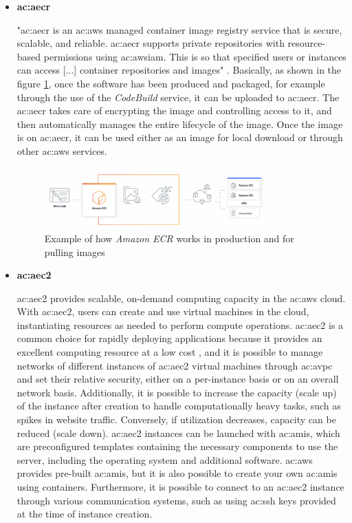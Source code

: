 \begin{itemize}
    \item[] \textbf{\gls{ac:aecr}}
    
    "\gls{ac:aecr} is an \gls{ac:aws} managed container image registry service that is secure, scalable, and reliable. \gls{ac:aecr} supports private repositories with resource-based permissions using \gls{ac:awsiam}. This is so that specified users or instances can access [...] container repositories and images" \cite{AmazonECR}. Basically, as shown in the figure \ref{fig:AWSECR}, once the software has been produced and packaged, for example through the use of the \textit{CodeBuild} service, it can be uploaded to \gls{ac:aecr}. The \gls{ac:aecr} takes care of encrypting the image and controlling access to it, and then automatically manages the entire lifecycle of the image. Once the image is on \gls{ac:aecr}, it can be used either as an image for local download or through other \gls{ac:aws} services. 
    \begin{figure}[h]  %
        \centering
        \includegraphics[width=0.8\textwidth]{images/AWSECR.png}  %
        \caption{Example of how \textit{Amazon ECR} works in production and for pulling images \cite{AWSECR}}
        \label{fig:AWSECR}
    \end{figure}
    
    \item[] \textbf{\gls{ac:aec2}}
    
    \gls{ac:aec2} provides scalable, on-demand computing capacity in the \gls{ac:aws} cloud. With \gls{ac:aec2}, users can create and use virtual machines in the cloud, instantiating resources as needed to perform compute operations. \gls{ac:aec2} is a common choice for rapidly deploying applications because it provides an excellent computing resource at a low cost \cite{AWSEC2}, and it is possible to manage networks of different instances of \gls{ac:aec2} virtual machines through \gls{ac:avpc} and set their relative security, either on a per-instance basis or on an overall network basis. Additionally, it is possible to increase the capacity (scale up) of the instance after creation to handle computationally heavy tasks, such as spikes in website traffic. Conversely, if utilization decreases, capacity can be reduced (scale down). \gls{ac:aec2} instances can be launched with \gls{ac:ami}s, which are preconfigured templates containing the necessary components to use the server, including the operating system and additional software. \gls{ac:aws} provides pre-built \gls{ac:ami}s, but it is also possible to create your own \gls{ac:ami}s using containers. Furthermore, it is possible to connect to an \gls{ac:aec2} instance through various communication systems, such as using \gls{ac:ssh} keys provided at the time of instance creation.
          

\end{itemize}
